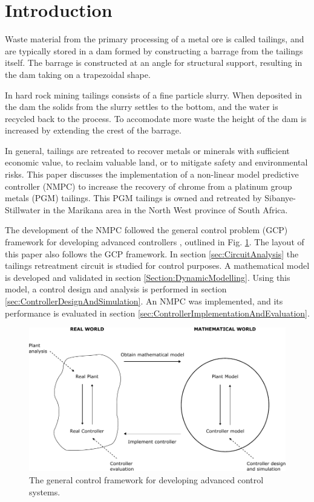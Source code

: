 \documentclass[preprint,authoryear,12pt]{elsarticle}
\begin{document}

\section{Introduction}\label{sec:background}
Waste material from the primary processing of a metal ore is called tailings, and are typically stored in a dam formed by constructing a barrage from the tailings itself. The barrage is constructed at an angle for structural support, resulting in the dam taking on a trapezoidal shape. 

In hard rock mining tailings consists of a fine particle slurry. When deposited in the dam the solids from the slurry settles to the bottom, and the water is recycled back to the process. To accomodate more waste the height of the dam is increased by extending the crest of the barrage.  

In general, tailings are retreated to recover metals or minerals with sufficient economic value, to reclaim valuable land, or to mitigate safety and environmental risks. This paper discusses the implementation of a non-linear model predictive controller (NMPC) to increase the recovery of chrome from a platinum group metals (PGM) tailings. This PGM tailings is owned and retreated by Sibanye-Stillwater in the Marikana area in the North West province of South Africa.

The development of the NMPC followed the general control problem (GCP) framework for developing advanced controllers \citep{Craig1997, CraigAndHenning2000}, outlined in Fig. \ref{fig:GeneralControlFramework}. The layout of this paper also follows the GCP framework. In section \ref{sec:CircuitAnalysis} the tailings retreatment circuit is studied for control purposes. A mathematical model is developed and validated in section \ref{Section:DynamicModelling}. Using this model, a control design and analysis is performed in section \ref{sec:ControllerDesignAndSimulation}. An NMPC was implemented, and its performance is evaluated in section \ref{sec:ControllerImplementationAndEvaluation}.

\begin{figure}[h!]
	\centering
	\includegraphics[width=5.2in]{GeneralControlFramework.pdf}
	\caption{The general control framework for developing advanced control systems.}
	\label{fig:GeneralControlFramework}
\end{figure}
\end{document}
